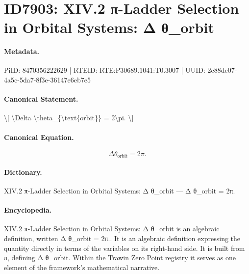 \section*{ID7903: XIV.2 π-Ladder Selection in Orbital Systems: Δ θ\_orbit}
\paragraph{Metadata.}
PiID: 8470356222629 | RTEID: RTE:P30689.1041:T0.3007 | UUID: 2c88de07-4a5c-5da7-8f3e-36147e6eb7e5

\paragraph{Canonical Statement.}
\textbackslash{}[ \textbackslash{}Delta \textbackslash{}theta\_\{\textbackslash{}text\{orbit\}\} = 2\textbackslash{}pi. \textbackslash{}]

\paragraph{Canonical Equation.}
\[
\Delta \theta_{\text{orbit}} = 2\pi.
\]

\paragraph{Dictionary.}
XIV.2 π-Ladder Selection in Orbital Systems: Δ θ\_orbit — Δ θ\_orbit = 2π.

\paragraph{Encyclopedia.}
XIV.2 π-Ladder Selection in Orbital Systems: Δ θ\_orbit is an algebraic definition, written Δ θ\_orbit = 2π.. It is an algebraic definition expressing the quantity directly in terms of the variables on its right-hand side. It is built from π, defining Δ θ\_orbit. Within the Trawin Zero Point registry it serves as one element of the framework's mathematical narrative.
